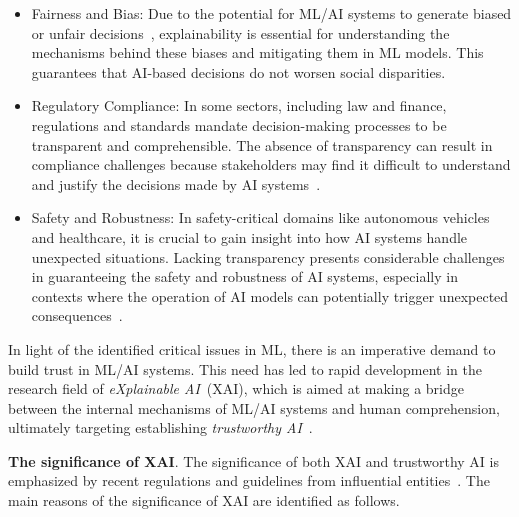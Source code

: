 \begin{itemize}
	\item Fairness and Bias: 
		Due to the potential for ML/AI systems to generate biased or unfair 
		decisions~\cite{propublica16,hhll-corr22}, explainability is essential for understanding the
		mechanisms behind these biases and mitigating them in ML models. 
		This guarantees that AI-based decisions do not worsen social disparities.
	\item Regulatory Compliance:
		In some sectors, including law and finance, regulations and standards mandate 
		decision-making processes to be transparent and comprehensible.
		The absence of transparency can result in compliance challenges because stakeholders 
		may find it difficult to understand and justify the decisions made by AI 
		systems~\cite{jiv-nmi19,sbbl-aes20,coeck-mitp20}.
	\item Safety and Robustness:
		In safety-critical domains like autonomous vehicles and healthcare, 
		it is crucial to gain insight into how AI systems handle unexpected situations.
		Lacking transparency presents considerable challenges in guaranteeing the safety and
		robustness of AI systems, especially in contexts where the operation of AI models 
		can potentially trigger unexpected consequences~\cite{dear-alr19}.
\end{itemize}

In light of the identified critical issues in ML, there is an imperative demand
to build trust in ML/AI systems.
%
This need has led to rapid development in the research field of \emph{eXplainable AI}~(XAI),
which is aimed at making a bridge between the internal mechanisms of ML/AI systems and human comprehension, 
ultimately targeting establishing \emph{trustworthy AI}~\cite{ms-rw22}.



\textbf{The significance of XAI}.
%
The significance of both XAI and trustworthy AI is emphasized by 
recent regulations and guidelines from influential entities~\cite{darpa-xai16,hlegai19,hlegai20,eucoord21,euaiact21,oecd21,unesco21,ms-rw22}.
%
The main reasons of the significance of XAI are identified 
as follows.

